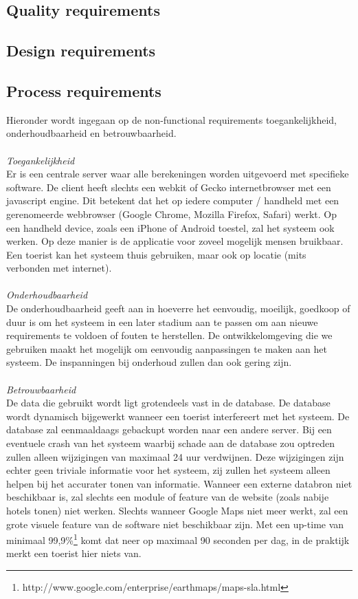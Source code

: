 \documentclass[a4paper,10pt]{article}
\newcommand{\rsubsection}[1]{
\subsection{#1}\label{sec:sub:#1}
}
\begin{document}
\rsubsection{Quality requirements}	
	\rsubsection{Design requirements}	
	\rsubsection{Process requirements}	
	Hieronder wordt ingegaan op de non-functional requirements toegankelijkheid, onderhoudbaarheid en betrouwbaarheid.\\	\\
	\textit{Toegankelijkheid}\\
			Er is een centrale server waar alle berekeningen worden uitgevoerd met specifieke software. De client heeft slechts een webkit of Gecko internetbrowser met een javascript engine. Dit betekent dat het op iedere computer / handheld met een gerenomeerde webbrowser (Google Chrome, Mozilla Firefox, Safari) werkt. Op een handheld device, zoals een iPhone of Android toestel, zal het systeem ook werken. Op deze manier is de applicatie voor zoveel mogelijk mensen bruikbaar. Een toerist kan het systeem thuis gebruiken, maar ook op locatie (mits verbonden met internet).\\ \\
			\textit{Onderhoudbaarheid}\\
			De onderhoudbaarheid geeft aan in hoeverre het eenvoudig, moeilijk, goedkoop of duur is om het systeem in een later stadium aan te passen om aan nieuwe requirements te voldoen of fouten te herstellen. De ontwikkelomgeving die we gebruiken maakt het mogelijk om eenvoudig aanpassingen te maken aan het systeem. De inspanningen bij onderhoud zullen dan ook gering zijn.\\ \\
			\textit{Betrouwbaarheid}\\
			De data die gebruikt wordt ligt grotendeels vast in de database. De database wordt dynamisch bijgewerkt wanneer een toerist interfereert met het systeem. De database zal eenmaaldaags gebackupt worden naar een andere server. Bij een eventuele crash van het systeem waarbij schade aan de database zou optreden zullen alleen wijzigingen van maximaal 24 uur verdwijnen. Deze wijzigingen zijn echter geen triviale informatie voor het systeem, zij zullen het systeem alleen helpen bij het accurater tonen van informatie. Wanneer een externe databron niet beschikbaar is, zal slechts een module of feature van de website (zoals nabije hotels tonen) niet werken. Slechts wanneer Google Maps niet meer werkt, zal een grote visuele feature van de software niet beschikbaar zijn. Met een up-time van minimaal 99,9\%\footnote{http://www.google.com/enterprise/earthmaps/maps-sla.html} komt dat neer op maximaal 90 seconden per dag, in de praktijk merkt een toerist hier niets van.
			
\end{document}
